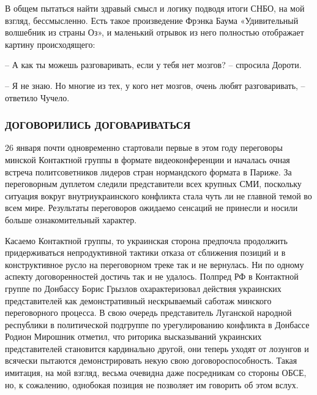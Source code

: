 В общем пытаться найти здравый смысл и логику подводя итоги СНБО, на мой
взгляд, бессмысленно. Есть такое произведение Фрэнка Баума «Удивительный
волшебник из страны Оз», и маленький отрывок из него полностью отображает
картину происходящего:

– А как ты можешь разговаривать, если у тебя нет мозгов? – спросила Дороти.

– Я не знаю. Но многие из тех, у кого нет мозгов, очень любят разговаривать, –
ответило Чучело.

\subsubsection{ДОГОВОРИЛИСЬ ДОГОВАРИВАТЬСЯ}

26 января почти одновременно стартовали первые в этом году переговоры минской
Контактной группы в формате видеоконференции и началась очная встреча
политсоветников лидеров стран нормандского формата в Париже. За переговорным
дуплетом следили представители всех крупных СМИ, поскольку ситуация вокруг
внутриукраинского конфликта стала чуть ли не главной темой во всем мире.
Результаты переговоров ожидаемо сенсаций не принесли и носили больше
ознакомительный характер. 

Касаемо Контактной группы, то украинская сторона предпочла продолжить
придерживаться непродуктивной тактики отказа от сближения позиций и в
конструктивное русло на переговорном треке так и не вернулась. Ни по одному
аспекту договоренностей достичь так и не удалось. Полпред РФ в Контактной
группе по Донбассу Борис Грызлов охарактеризовал действия украинских
представителей как демонстративный нескрываемый саботаж минского переговорного
процесса. В свою очередь представитель Луганской народной республики в
политической подгруппе по урегулированию конфликта в Донбассе Родион Мирошник
отметил, что риторика высказываний украинских представителей становится
кардинально другой, они теперь уходят от лозунгов и всячески пытаются
демонстрировать некую свою договороспособность. Такая имитация, на мой взгляд,
весьма очевидна даже посредникам со стороны ОБСЕ, но, к сожалению, однобокая
позиция не позволяет им говорить об этом вслух.

